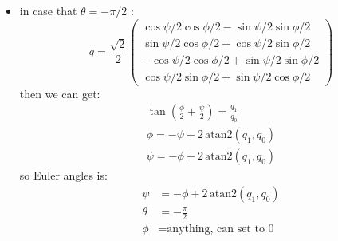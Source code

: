 \documentclass{article}
\begin{document}
\begin{itemize}
\item in case that $\theta = -\pi/2$ :
\begin{equation}
q = \frac{\sqrt{2}}{2}\begin{pmatrix}%
\cos{\psi/2}\cos{\phi/2}-\sin{\psi/2}\sin{\phi/2} \\
\sin{\psi/2}\cos{\phi/2}+\cos{\psi/2}\sin{\phi/2} \\
-\cos{\psi/2}\cos{\phi/2}+\sin{\psi/2}\sin{\phi/2} \\
\cos{\psi/2}\sin{\phi/2}+\sin{\psi/2}\cos{\phi/2}
\end{pmatrix}
\end{equation}
then we can get:
\begin{displaymath}
\begin{aligned}
  \tan{\left(\frac{\phi}{2}+\frac{\psi}{2}\right)} = \frac{q_1}{q_0} \\
\phi = -\psi + 2\, \text{atan2}(q_1, q_0) \\
\psi = -\phi + 2\, \text{atan2}(q_1, q_0)
\end{aligned}
\end{displaymath}
so Euler angles is:
\begin{equation}%
\begin{aligned}%
\psi &= -\phi + 2\, \text{atan2}(q_1, q_0) \\
\theta &= -\frac{\pi}{2} \\
\phi &= \text{anything, can set to 0}
\end{aligned}%
\end{equation}

\end{itemize}
\end{document}
